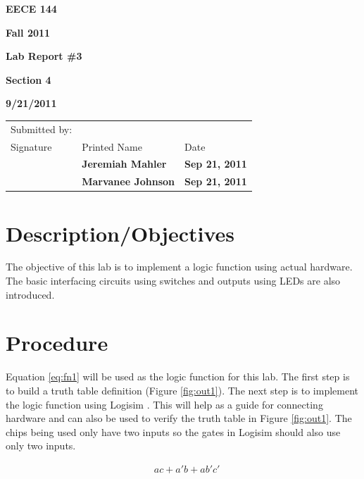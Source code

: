 \documentclass[12pt]{article}
\begin{document}

\centerline{\bf EECE 144}
\centerline{\bf Fall 2011}
\centerline{\bf}
\centerline{\bf Lab Report \#3}
\centerline{\bf Section 4}
\centerline{\bf 9/21/2011}

\begin{center}
\begin{tabularx}{\textwidth}[b]{X l l}
Submitted by: & & \\
Signature & Printed Name & Date \\
\hline
\multicolumn{1}{|X|}{} & \multicolumn{1}{|l|}{\bigstrut \bf Jeremiah Mahler} & \multicolumn{1}{|l|}{\bf Sep 21, 2011} \\
\hline
\multicolumn{1}{|X|}{} & \multicolumn{1}{|l|}{\bigstrut \bf Marvanee Johnson} & \multicolumn{1}{|l|}{\bf Sep 21, 2011} \\
\hline
\end{tabularx}
\end{center}

\section{Description/Objectives}

The objective of this lab is to implement a logic function
using actual hardware.
The basic interfacing circuits using switches and outputs
using LEDs are also introduced.

\section{Procedure}

Equation \ref{eq:fn1} will be used as the logic function for this lab.
The first step is to build a truth table definition (Figure \ref{fig:out1}).
The next step is to implement the logic function using Logisim \cite{LOGISIM}.
This will help as a guide for connecting hardware and can also be used
to verify the truth table in Figure \ref{fig:out1}.
The chips being used only have two inputs so the gates in Logisim should
also use only two inputs.

\nocite{LOGISIM}

\begin{align}
& a c + a' b + a b' c' \label{eq:fn1}
\end{align}
\end{document}
